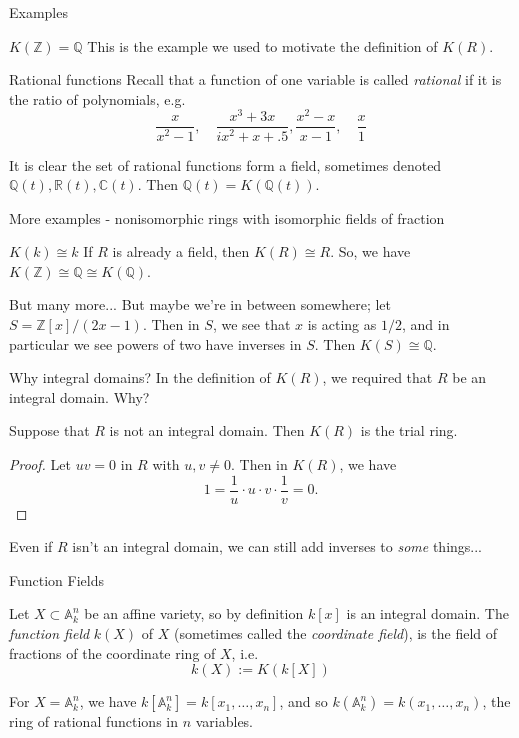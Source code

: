 \documentclass{beamer}
\newcommand{\C}{\mathbb{C}}
\newcommand{\Z}{\mathbb{Z}}
\newcommand{\R}{\mathbb{R}}
\newcommand{\Q}{\mathbb{Q}}
\newcommand{\A}{\mathbb{A}}
\begin{document}
\begin{frame}{Examples}
  \begin{block}{$K(\Z)=\Q$}
    This is the example we used to motivate the definition of $K(R)$.
  \end{block}
  \begin{block}{Rational functions}
    Recall that a function of one variable is called \emph{rational} if it is the ratio of polynomials, e.g.
    $$\frac{x}{x^2-1}, \quad \frac{x^3+3x}{ix^2+x+.5}, \frac{x^2-x}{x-1}, \quad \frac{x}{1}$$

    It is clear the set of rational functions form a field, sometimes denoted $\Q(t), \R(t), \C(t)$.
    Then $\Q(t)=K(\Q(t))$.
    \end{block}
\end{frame}
\begin{frame}{More examples - nonisomorphic rings with isomorphic fields of fraction}
  \begin{block}{$K(k)\cong k$}
    If $R$ is already a field, then $K(R)\cong R$.  So, we have $K(\Z)\cong \Q\cong K(\Q)$.
  \end{block}
  \begin{block}{But many more...}
    But maybe we're in between somewhere; let $S=\Z[x]/(2x-1)$.  Then in $S$, we see that $x$ is acting as $1/2$, and in particular we see powers of two have inverses in $S$.   Then
    $K(S)\cong\Q$. 
  \end{block}

  \end{frame}

\begin{frame}{Why integral domains?}
  In the definition of $K(R)$, we required that $R$ be an integral domain.  Why?

  \begin{lemma} Suppose that $R$ is not an integral domain.  Then $K(R)$ is the trial ring.\end{lemma}
  \begin{proof}
    Let $uv=0$ in $R$ with $u,v\neq 0$.  Then in $K(R)$, we have
    $$1=\frac{1}{u}\cdot u\cdot v\cdot \frac{1}{v}=0.$$
    \end{proof}
Even if $R$ isn't an integral domain, we can still add inverses to \emph{some} things...
\end{frame}
  

\begin{frame}{Function Fields}

  \begin{definition} Let $X\subset \A^n_k$ be an affine variety, so by definition $k[x]$ is an integral domain.  The \emph{function field} $k(X)$ of $X$ (sometimes called the \emph{coordinate field}), is the field of fractions of the coordinate ring of $X$, i.e.
    $$k(X):= K(k[X])$$
  \end{definition}

  \begin{example} For $X=\A^n_k$, we have $k[\A^n_k]=k[x_1,\dots, x_n]$, and so $k(\A^n_k)=k(x_1,\dots, x_n)$, the ring of rational functions in $n$ variables.
    \end{example}
\end{frame}
\end{document}
